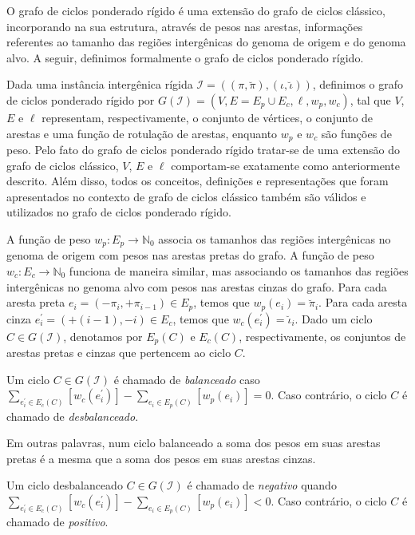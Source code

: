 O grafo de ciclos ponderado rígido é uma extensão do grafo de ciclos clássico, incorporando na sua estrutura, através de pesos nas arestas, informações referentes ao tamanho das regiões intergênicas do genoma de origem e do genoma alvo. A seguir, definimos formalmente o grafo de ciclos ponderado rígido.

Dada uma instância intergênica rígida $\mathcal{I} = ((\pi,\breve\pi),(\iota,\breve\iota))$, definimos o grafo de ciclos ponderado rígido por $G(\mathcal{I}) = (V, E=E_p \cup E_c, \ell, w_p, w_c)$, tal que $V$, $E$ e $\ell$ representam, respectivamente, o conjunto de vértices, o conjunto de arestas e uma função de rotulação de arestas, enquanto $w_p$ e $w_c$ são funções de peso. Pelo fato do grafo de ciclos ponderado rígido tratar-se de uma extensão do grafo de ciclos clássico, $V$, $E$ e $\ell$ comportam-se exatamente como anteriormente descrito. Além disso, todos os conceitos, definições e representações que foram apresentados no contexto de grafo de ciclos clássico também são válidos e utilizados no grafo de ciclos ponderado rígido.

A função de peso $w_p : E_p \rightarrow \mathbb{N}_0$ associa os tamanhos das regiões intergênicas no genoma de origem com pesos nas arestas pretas do grafo. A função de peso $w_c : E_c \rightarrow \mathbb{N}_0$ funciona de maneira similar, mas associando os tamanhos das regiões intergênicas no genoma alvo com pesos nas arestas cinzas do grafo. Para cada aresta preta $e_i = (-\pi_i, +\pi_{i-1}) \in E_p$, temos que $w_p(e_i) = \breve\pi_i$. Para cada aresta cinza $e^{\prime}_i = (+(i-1), -i) \in E_c$, temos que $w_c(e^{\prime}_i) = \breve\iota_i$. Dado um ciclo $C \in G(\mathcal{I})$, denotamos por $E_p(C)$ e $E_c(C)$, respectivamente, os conjuntos de arestas pretas e cinzas que pertencem ao ciclo $C$. 

\begin{definition}
Um ciclo $C \in G(\mathcal{I})$ é chamado de \emph{balanceado} caso $\sum_{e^{\prime}_i \in E_c(C)} [w_c(e^{\prime}_i)] - \sum_{e_i \in E_p(C)} [w_p(e_i)] = 0$. Caso contrário, o ciclo $C$ é chamado de \emph{desbalanceado}.
\end{definition}

Em outras palavras, num ciclo balanceado a soma dos pesos em suas arestas pretas é a mesma que a soma dos pesos em suas arestas cinzas. 

\begin{definition}
Um ciclo desbalanceado $C \in G(\mathcal{I})$ é chamado de \emph{negativo} quando $\sum_{e^{\prime}_i \in E_c(C)} [w_c(e^{\prime}_i)] - \sum_{e_i \in E_p(C)} [w_p(e_i)] < 0$. Caso contrário, o ciclo $C$ é chamado de \emph{positivo}.
\end{definition}

